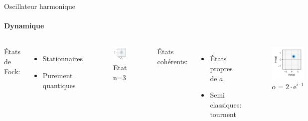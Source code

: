 \documentclass[11pt]{beamer}
\begin{document}
\begin{frame}{Oscillateur harmonique}
\framesubtitle{Dynamique}
\begin{columns}
États de Fock:\begin{itemize}
\item Stationnaires
\item Purement quantiques
\end{itemize}

\begin{figure}
\centering
\includegraphics[width=0.7\linewidth]{pres_wigner_fock}
\caption{Etat n=3}
\label{fig:preswignerfock}
\end{figure}

États cohérents:\begin{itemize}
\item États propres de $a$.
\item Semi classiques: tournent
\end{itemize}

\begin{figure}
\centering
\includegraphics[width=0.7\linewidth]{pres_wigner_coh}
\caption{$\alpha=2\cdot\textrm{e}^{i\cdot1}$}
\label{fig:preswignercoh}
\end{figure}
\end{columns}
\end{frame}
\end{document}
